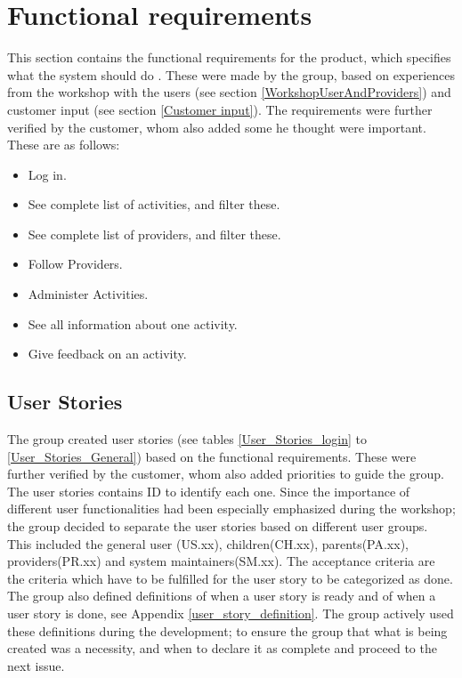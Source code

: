 \section{Functional requirements}
\label{functional_requirements}
This section contains the functional requirements for the product, which specifies what the system should do \cite{requirements}. These were made by the group, based on experiences from the workshop with the users (see section \ref{WorkshopUserAndProviders}) and customer input (see section \ref{Customer input}). The requirements were further verified by the customer, whom also added some he thought were important. These are as follows:
\begin{itemize}[noitemsep]
    \item Log in.
    \item See complete list of activities, and filter these.
    \item See complete list of providers, and filter these.
    \item Follow Providers. 
    \item Administer Activities.
    \item See all information about one activity.
    \item Give feedback on an activity.
\end{itemize}


\subsection{User Stories}
\label{User stories}
The group created user stories (see tables \ref{User_Stories_login} to \ref{User_Stories_General}) based on the functional requirements. These were further verified by the customer, whom also added priorities to guide the group. The user stories contains ID to identify each one. Since the importance of different user functionalities had been especially emphasized during the workshop; the group decided to separate the user stories based on different user groups. This included the general user (US.xx), children(CH.xx), parents(PA.xx), providers(PR.xx) and system maintainers(SM.xx). The acceptance criteria are the criteria which have to be fulfilled for the user story to be categorized as done. The group also defined definitions of when a user story is ready and of when a user story is done, see Appendix \ref{user_story_definition}. The group actively used these definitions during the development; to ensure the group that what is being created was a necessity, and when to declare it as complete and proceed to the next issue.  

